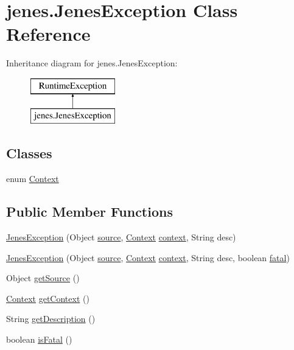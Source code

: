 \hypertarget{classjenes_1_1_jenes_exception}{\section{jenes.\-Jenes\-Exception Class Reference}
\label{classjenes_1_1_jenes_exception}
}
Inheritance diagram for jenes.\-Jenes\-Exception\-:\begin{figure}[H]
\begin{center}
\leavevmode
\includegraphics[height=2.000000cm]{classjenes_1_1_jenes_exception}
\end{center}
\end{figure}
\subsection*{Classes}
\begin{DoxyCompactItemize}
\item 
enum \hyperlink{enumjenes_1_1_jenes_exception_1_1_context}{Context}
\end{DoxyCompactItemize}
\subsection*{Public Member Functions}
\begin{DoxyCompactItemize}
\item 
\hyperlink{classjenes_1_1_jenes_exception_a0896ada42c15de11ae090d00f60712e6}{Jenes\-Exception} (Object \hyperlink{classjenes_1_1_jenes_exception_aa082145f9f5ec052a640e6b2c43fdf71}{source}, \hyperlink{enumjenes_1_1_jenes_exception_1_1_context}{Context} \hyperlink{classjenes_1_1_jenes_exception_a0ed4376ac804c15c7b6b69f4ba5db061}{context}, String desc)
\item 
\hyperlink{classjenes_1_1_jenes_exception_ab12d2e209aa3cfe14f08b4732271d9d9}{Jenes\-Exception} (Object \hyperlink{classjenes_1_1_jenes_exception_aa082145f9f5ec052a640e6b2c43fdf71}{source}, \hyperlink{enumjenes_1_1_jenes_exception_1_1_context}{Context} \hyperlink{classjenes_1_1_jenes_exception_a0ed4376ac804c15c7b6b69f4ba5db061}{context}, String desc, boolean \hyperlink{classjenes_1_1_jenes_exception_aed895f6a8b793ec64394b3ed9f8a01e3}{fatal})
\item 
Object \hyperlink{classjenes_1_1_jenes_exception_a1dc5c4b0404aeab984604002fad7dbfb}{get\-Source} ()
\item 
\hyperlink{enumjenes_1_1_jenes_exception_1_1_context}{Context} \hyperlink{classjenes_1_1_jenes_exception_a9a47a0e830dda47c1f9841461fb29726}{get\-Context} ()
\item 
String \hyperlink{classjenes_1_1_jenes_exception_a0d37f5de0bddb6c1a3014816f217281c}{get\-Description} ()
\item 
boolean \hyperlink{classjenes_1_1_jenes_exception_a4d673283c5e13dd3b95e73cf780e9419}{is\-Fatal} ()
\end{DoxyCompactItemize}
